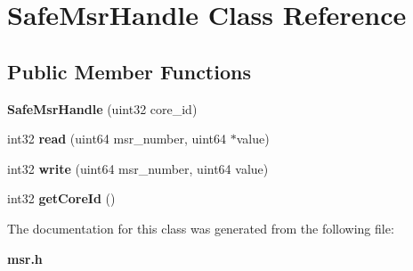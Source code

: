 \section{Safe\+Msr\+Handle Class Reference}
\label{classSafeMsrHandle}
\subsection*{Public Member Functions}
\begin{DoxyCompactItemize}
\item 
{\bfseries Safe\+Msr\+Handle} (uint32 core\+\_\+id)\label{classSafeMsrHandle_af7a62cd143e86be1ef2d2f6d5f67fc30}

\item 
int32 {\bfseries read} (uint64 msr\+\_\+number, uint64 $\ast$value)\label{classSafeMsrHandle_af2ad27203ae5d1072ad8e1ca5d988ce5}

\item 
int32 {\bfseries write} (uint64 msr\+\_\+number, uint64 value)\label{classSafeMsrHandle_a252aa9dee867d8b8f787b1de007b49a7}

\item 
int32 {\bfseries get\+Core\+Id} ()\label{classSafeMsrHandle_ae8735531f00abaaa17aac519c1e5360e}

\end{DoxyCompactItemize}


The documentation for this class was generated from the following file\+:\begin{DoxyCompactItemize}
\item 
{\bf msr.\+h}\end{DoxyCompactItemize}
